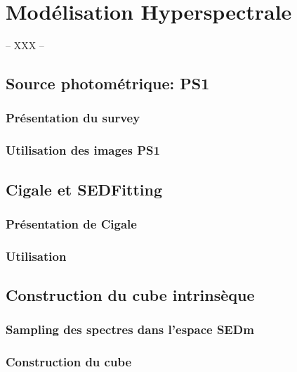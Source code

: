 \documentclass[../main/main.tex]{subfiles}
\begin{document}
\chapter{Modélisation Hyperspectrale}\label{ch:modelhyperspec}

-- XXX --

\minitoc
\newpage

\section{Source photométrique: PS1}

\subsection{Présentation du survey}

\subsection{Utilisation des images PS1}


\section{Cigale et SEDFitting}

\subsection{Présentation de Cigale}

\subsection{Utilisation}

\section{Construction du cube intrinsèque}

\subsection{Sampling des spectres dans l'espace SEDm}

\subsection{Construction du cube}
\end{document}
